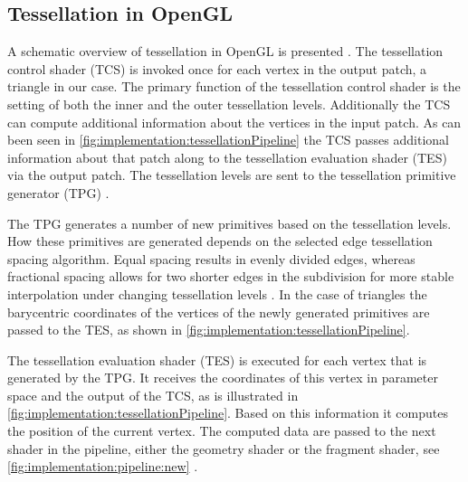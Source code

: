 \subsection{Tessellation in OpenGL}
\label{ss:implementation:pipeline}

	A schematic overview of tessellation in OpenGL is presented .
	The tessellation control shader (TCS) is invoked once for each vertex in the output patch, a triangle in our case. 
	The primary function of the tessellation control shader is the setting of both the inner and the outer tessellation levels. Additionally the TCS can compute additional information about the vertices in the input patch. 
	As can been seen in \cref{fig:implementation:tessellationPipeline} the TCS passes additional information about that patch along to the tessellation evaluation shader (TES) via the output patch. The tessellation levels are sent to the tessellation primitive generator (TPG) \cite{wolff2013opengl}.

	The TPG generates a number of new primitives based on the tessellation levels. How these primitives are generated depends on the selected edge tessellation spacing algorithm. Equal spacing results in evenly divided edges, whereas fractional spacing allows for two shorter edges in the subdivision for more stable interpolation under changing tessellation levels \cite{wolff2013opengl,openGL41Core}. In the case of triangles the barycentric coordinates of the vertices of the newly generated primitives are passed to the TES, as shown in \cref{fig:implementation:tessellationPipeline}.

	The tessellation evaluation shader (TES) is executed for each vertex that is generated by the TPG. 
	It receives the coordinates of this vertex in parameter space and the output of the TCS, as is illustrated in \cref{fig:implementation:tessellationPipeline}. 
	Based on this information it computes the position of the current vertex. 
	The computed data are passed to the next shader in the pipeline, either the geometry shader or the fragment shader, see \cref{fig:implementation:pipeline:new} \cite{wolff2013opengl}.

